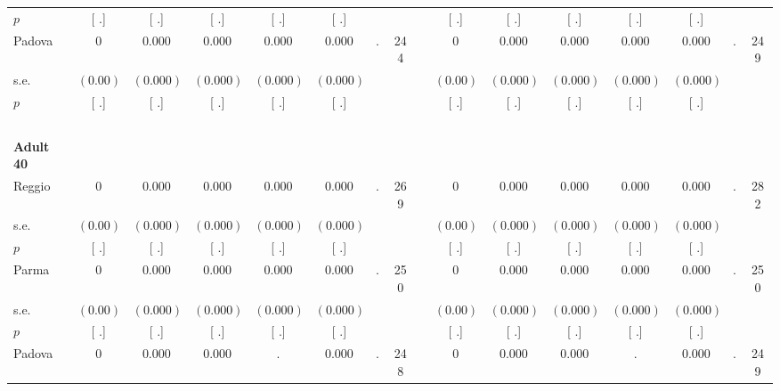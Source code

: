 \begin{longtable}{L{8em} c c c c c c c p{1em} c c c c c c c}
\quad \quad \quad \quad $ p$ & [        .] & [        .] & [        .] & [        .] & [        .] & & & & [        .] & [        .] & [        .] & [        .] & [        .] & &  \\[1em]
\quad \quad \quad Padova& 0 &     0.000 &     0.000 &     0.000 &     0.000 &         . &       244 & & 0 &     0.000 &     0.000 &     0.000 &     0.000 &         . &       249  \\*
\quad \quad \quad \quad s.e.& $ (     0.00)$ & $ (    0.000)$ & $ (    0.000)$ & $ (    0.000)$ & $ (    0.000)$ & & & & $ (     0.00)$ & $ (    0.000)$ & $ (    0.000)$ & $ (    0.000)$ & $ (    0.000)$ & &  \\*
\quad \quad \quad \quad $ p$ & [        .] & [        .] & [        .] & [        .] & [        .] & & & & [        .] & [        .] & [        .] & [        .] & [        .] & &  \\[1em]
~\\[1em]
\quad \quad \textbf{Adult 40} & & & & & & & & & & & & & & & \\* 
\quad \quad \quad Reggio& 0 &     0.000 &     0.000 &     0.000 &     0.000 &         . &       269 & & 0 &     0.000 &     0.000 &     0.000 &     0.000 &         . &       282  \\*
\quad \quad \quad \quad s.e.& $ (     0.00)$ & $ (    0.000)$ & $ (    0.000)$ & $ (    0.000)$ & $ (    0.000)$ & & & & $ (     0.00)$ & $ (    0.000)$ & $ (    0.000)$ & $ (    0.000)$ & $ (    0.000)$ & &  \\*
\quad \quad \quad \quad $ p$ & [        .] & [        .] & [        .] & [        .] & [        .] & & & & [        .] & [        .] & [        .] & [        .] & [        .] & &  \\[1em]
\quad \quad \quad Parma& 0 &     0.000 &     0.000 &     0.000 &     0.000 &         . &       250 & & 0 &     0.000 &     0.000 &     0.000 &     0.000 &         . &       250  \\*
\quad \quad \quad \quad s.e.& $ (     0.00)$ & $ (    0.000)$ & $ (    0.000)$ & $ (    0.000)$ & $ (    0.000)$ & & & & $ (     0.00)$ & $ (    0.000)$ & $ (    0.000)$ & $ (    0.000)$ & $ (    0.000)$ & &  \\*
\quad \quad \quad \quad $ p$ & [        .] & [        .] & [        .] & [        .] & [        .] & & & & [        .] & [        .] & [        .] & [        .] & [        .] & &  \\[1em]
\quad \quad \quad Padova& 0 &     0.000 &     0.000 &         . &     0.000 &         . &       248 & & 0 &     0.000 &     0.000 &         . &     0.000 &         . &       249  \\*

\end{longtable}
